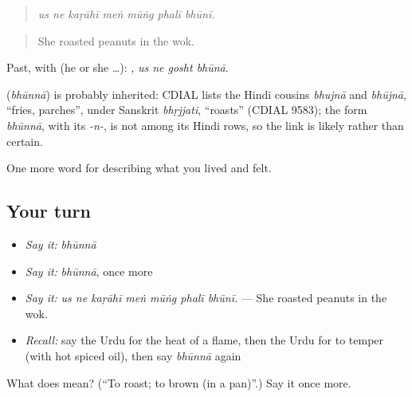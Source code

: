 \begin{quote}
      
\end{quote}

\begin{quote}
\emph{us ne kaṛāhī meṅ mūṅg phalī bhūnī.}
\end{quote}

\begin{quote}
She roasted peanuts in the wok.
\end{quote}

Past, with  (he or she …):    , \emph{us ne gosht bhūnā}.

\begin{cousinweb}
\textbf{} (\emph{bhūnnā}) is probably inherited: CDIAL lists the Hindi cousins \emph{bhujnā} and \emph{bhūjnā}, \textquotedblleft{}fries, parches\textquotedblright{}, under Sanskrit \emph{bhṛjjati}, \textquotedblleft{}roasts\textquotedblright{} (CDIAL 9583); the form \emph{bhūnnā}, with its \emph{-n-}, is not among its Hindi rows, so the link is likely rather than certain.
\end{cousinweb}

\begin{grammarlens}[title={What you've built}]
One more word for describing what you lived and felt.
\end{grammarlens}

\subsection*{Your turn}
\begin{itemize}
\raggedright
  \item \emph{Say it:} \emph{bhūnnā}
  \item \emph{Say it:} \emph{bhūnnā}, once more
  \item \emph{Say it:} \emph{us ne kaṛāhī meṅ mūṅg phalī bhūnī.} — She roasted peanuts in the wok.
  \item \emph{Recall:} say the Urdu for the heat of a flame, then the Urdu for to temper (with hot spiced oil), then say \emph{bhūnnā} again
\end{itemize}

\begin{tcolorbox}[breakable,colback=teal!4,colframe=teal!35!black,title={Before you move on}]
What does  mean? (\textquotedblleft{}To roast; to brown (in a pan)\textquotedblright{}.) Say it once more.
\end{tcolorbox}
